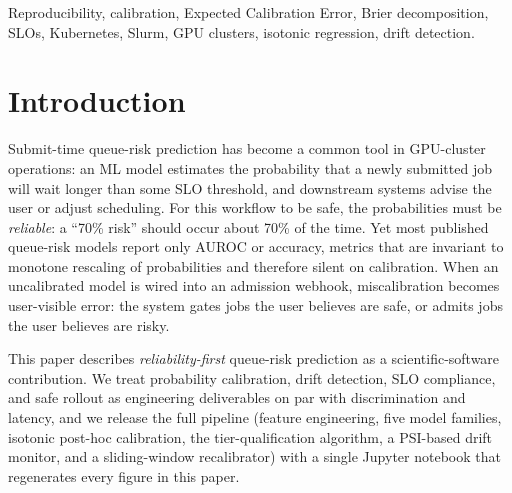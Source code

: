 \documentclass[conference]{IEEEtran}
\begin{document}
\begin{IEEEkeywords}
Reproducibility, calibration, Expected Calibration Error, Brier decomposition, SLOs, Kubernetes, Slurm, GPU clusters, isotonic regression, drift detection.
\end{IEEEkeywords}

\section{Introduction}
Submit-time queue-risk prediction has become a common tool in GPU-cluster operations: an ML model estimates the probability that a newly submitted job will wait longer than some SLO threshold, and downstream systems advise the user or adjust scheduling. For this workflow to be safe, the probabilities must be \emph{reliable}: a ``70\% risk'' should occur about 70\% of the time. Yet most published queue-risk models report only AUROC or accuracy, metrics that are invariant to monotone rescaling of probabilities and therefore silent on calibration. When an uncalibrated model is wired into an admission webhook, miscalibration becomes user-visible error: the system gates jobs the user believes are safe, or admits jobs the user believes are risky.

This paper describes \textit{reliability-first} queue-risk prediction as a scientific-software contribution. We treat probability calibration, drift detection, SLO compliance, and safe rollout as engineering deliverables on par with discrimination and latency, and we release the full pipeline (feature engineering, five model families, isotonic post-hoc calibration, the tier-qualification algorithm, a PSI-based drift monitor, and a sliding-window recalibrator) with a single Jupyter notebook that regenerates every figure in this paper.
\end{document}
